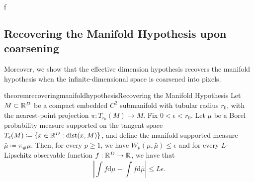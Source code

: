 \documentclass{article}
\begin{document}
f%






\newpage

\subsection{Recovering the Manifold Hypothesis upon coarsening}
Moreover, we show that the effective dimension hypothesis recovers the manifold hypothesis when the infinite-dimensional space is coarsened into pixels.

\begin{restatable}{theorem}{recoveringmanifoldhypothesis}{Recovering the Manifold Hypothesis}\label{theorem: recovering the manifold hypothesis}
	Let $M\subset \mathbb{R}^D$ be a compact embedded $C^2$ submanifold with tubular radius $r_0$, with the nearest-point projection $\pi:T_{r_0}(M)\to M$. Fix $0<\epsilon < r_0$. Let $\mu$ be a Borel probability measure supported on the tangent space $T_\epsilon(M)\coloneqq \{x\in\mathbb{R}^D: \mathrm{dist}(x,M)\}$, and define the manifold-supported measure $\bar{\mu}\coloneqq \pi_{\#}\mu$. Then, for every $p\geq 1$, we have $W_p(\mu,\bar{\mu})\leq \epsilon$ and for every $L$-Lipschitz observable function $f:\mathbb{R}^D\to\mathbb{R}$, we have that
	\[\left|\int f \mathrm d\mu - \int f \mathrm d\bar{\mu} \right| \leq L \epsilon.\]
\end{restatable}
\end{document}
